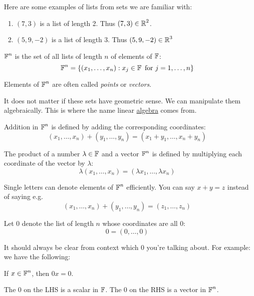 Here are some examples of lists from sets we are familiar with:
\begin{enumerate}
    \item $(7, 3)$ is a list of length 2. Thus $(7, 3) \in \operatorname{\mathbb{R}}^2$.
    \item $(5, 9, -2)$ is a list of length 3. Thus $(5, 9, -2) \in \operatorname{\mathbb{R}}^3$
\end{enumerate}

\begin{definition}[$\F^n$]
    $\F^n$ is the set of all lists of length $n$ of elements of $\operatorname{\mathbb{F}}$:
    \[ \operatorname{\mathbb{F}}^n = \{(x_1, \ldots, x_n) : x_j \in \operatorname{\mathbb{F}} \text{ for } j = 1, \ldots, n\} \]
\end{definition}

Elements of $\F^n$ are often called \textit{points} or \textit{vectors}. 

It does not matter if these sets have geometric sense. We can manipulate them algebraically.
This is where the name linear \underline{algebra} comes from.

\begin{definition}[Addition in $\F^n$]
    Addition in $\F^n$ is defined by adding the corresponding coordinates:
    \[ (x_1, \ldots, x_n) + (y_1, \ldots, y_n) = (x_1+y_1, \ldots, x_n+y_n) \]
\end{definition}

\begin{definition}
    The product of a number $\lambda \in \operatorname{\mathbb{F}}$ and a vector $\F^n$ is defined by
    multiplying each coordinate of the vector by $\lambda$:
    \[\lambda (x_1, \ldots, x_n) = (\lambda x_1, \ldots, \lambda x_n) \] 
\end{definition}

Single letters can denote elements of $\F^n$ efficiently. You can say $x + y = z$ instead of saying e.g.
\[ (x_1, \ldots, x_n) + (y_1, \ldots, y_n) = (z_1, \ldots, z_n) \]

\begin{definition}[0 list]
    Let 0 denote the list of length $n$ whose coordinates are all 0:
    \[ 0 = (0, \ldots, 0) \]
\end{definition}

It should always be clear from context which 0 you're talking about. For example:
we have the following:
\begin{theorem*}
    If $x \in \operatorname{\mathbb{F}}^n$, then $0x = 0$.
\end{theorem*}

The 0 on the LHS is a scalar in $\operatorname{\mathbb{F}}$. The 0 on the RHS is a vector in $\F^n$.

